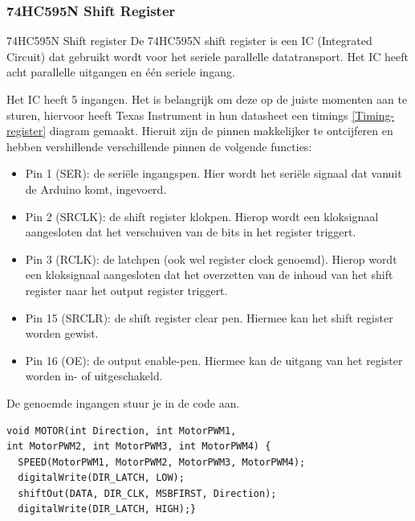 \subsubsection{74HC595N Shift Register}
74HC595N\cite{shiftregister} Shift register
De 74HC595N shift register\cite{shiftregister} is een \gls{IC} (Integrated Circuit) dat gebruikt wordt voor het seriele parallelle datatransport. Het IC heeft acht parallelle uitgangen en één seriele ingang. 

Het \gls{IC} heeft 5 ingangen. Het is belangrijk om deze op de juiste momenten aan te sturen, hiervoor heeft Texas Instrument in hun datasheet\cite{shiftregister} een timings \eqref{Timing-register} diagram gemaakt. Hieruit zijn de pinnen makkelijker te ontcijferen en hebben vershillende verschillende pinnen de volgende functies:
\begin{itemize}
    \item Pin 1 (SER): de seriële ingangspen. Hier wordt het seriële signaal dat vanuit de Arduino komt, ingevoerd.
    \item Pin 2 (SRCLK): de shift register klokpen. Hierop wordt een kloksignaal aangesloten dat het verschuiven van de bits in het register triggert.
    \item Pin 3 (RCLK): de latchpen (ook wel register clock genoemd). Hierop wordt een kloksignaal aangesloten dat het overzetten van de inhoud van het shift register naar het output register triggert.
    \item Pin 15 (SRCLR): de shift register clear pen. Hiermee kan het shift register worden gewist.
    \item Pin 16 (OE): de output enable-pen. Hiermee kan de uitgang van het register worden in- of uitgeschakeld.
\end{itemize}
De genoemde ingangen stuur je in de code aan.
\begin{lstlisting}
void MOTOR(int Direction, int MotorPWM1,
int MotorPWM2, int MotorPWM3, int MotorPWM4) {
  SPEED(MotorPWM1, MotorPWM2, MotorPWM3, MotorPWM4);
  digitalWrite(DIR_LATCH, LOW);
  shiftOut(DATA, DIR_CLK, MSBFIRST, Direction);
  digitalWrite(DIR_LATCH, HIGH);}
\end{lstlisting}

